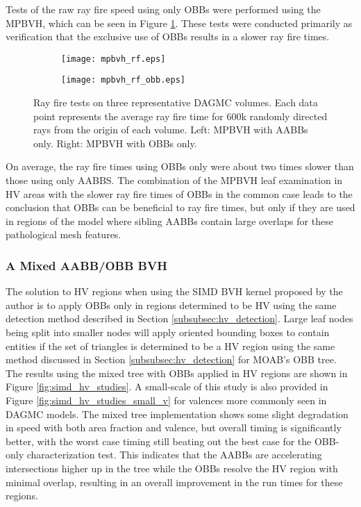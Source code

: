 Tests of the raw ray fire speed using only OBBs were performed using the
MPBVH, which can be seen in Figure
\ref{fig:rf_test_results_obbs}. These tests were conducted primarily as
verification that the exclusive use of OBBs results in a slower ray fire times. 

\begin{figure}[H]
  
  \begin{subfigure}{0.5\textwidth}
    \texttt{[image: mpbvh\_rf.eps]}
  \end{subfigure}%
  \hfill
  \begin{subfigure}{0.5\textwidth}
    \texttt{[image: mpbvh\_rf\_obb.eps]}
  \end{subfigure}
  
  \caption[Ray fire timings for the MPBVH with oriented bounding boxes.]{Ray
    fire tests on three representative DAGMC volumes. Each data point represents
    the average ray fire time for 600k randomly directed rays from the origin of
    each volume. Left: MPBVH with AABBs only. Right: MPBVH with OBBs only.}
  \label{fig:rf_test_results_obbs}
\end{figure}

On average, the ray fire times using OBBs only were about two times slower
than those using only AABBS. The combination of the MPBVH leaf
examination in HV areas with the slower ray fire times of OBBs in the
common case leads to the conclusion that OBBs can be beneficial to ray fire
times, but only if they are used in regions of the model where sibling
AABBs contain large overlaps for these pathological mesh features. 

\subsubsection{A Mixed AABB/OBB BVH}

The solution to HV regions when using the SIMD BVH
kernel proposed by the author is to apply OBBs only in regions determined to be
HV using the same detection method described in Section
\ref{subsubsec:hv_detection}. Large leaf nodes being split into smaller nodes
will apply oriented bounding boxes to contain entities if the set of triangles
is determined to be a HV region using the same method discussed in
Section \ref{subsubsec:hv_detection} for MOAB's OBB tree. The results using the mixed tree with
OBBs applied in HV regions are shown in Figure \ref{fig:simd_hv_studies}. A
small-scale of this study is also provided in Figure
\ref{fig:simd_hv_studies_small_v} for valences more commonly seen in DAGMC
models.
The
mixed tree implementation shows some slight degradation in speed with both area
fraction and valence, but overall timing is significantly better, with the worst
case timing still beating out the best case for the OBB-only characterization
test. This indicates that the AABBs are accelerating intersections higher up in
the tree while the OBBs resolve the HV region with minimal overlap,
resulting in an overall improvement in the run times for these regions.

